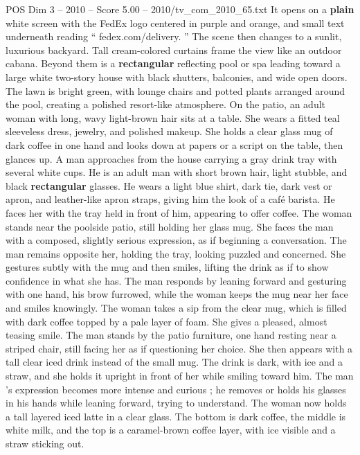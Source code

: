 \begin{textsample}{POS Dim 3 – 2010 – Score 5.00 – 2010/tv\_com\_2010\_65.txt}  \label{ex:f3_pos_083}
It opens on a \textbf{plain} white screen with the FedEx logo centered in purple and orange, and small text underneath reading “ fedex.com/delivery. ” The scene then changes to a sunlit, luxurious backyard.
Tall cream-colored curtains frame the view like an outdoor cabana.
Beyond them is a \textbf{rectangular} reflecting pool or spa leading toward a large white two-story house with black shutters, balconies, and wide open doors.
The lawn is bright green, with lounge chairs and potted plants arranged around the pool, creating a polished resort-like atmosphere.
On the patio, an adult woman with long, wavy light-brown hair sits at a table.
She wears a fitted teal sleeveless dress, jewelry, and polished makeup.
She holds a clear glass mug of dark coffee in one hand and looks down at papers or a script on the table, then glances up.
A man approaches from the house carrying a gray drink tray with several white cups.
He is an adult man with short brown hair, light stubble, and black \textbf{rectangular} glasses.
He wears a light blue shirt, dark tie, dark vest or apron, and leather-like apron straps, giving him the look of a café barista.
He faces her with the tray held in front of him, appearing to offer coffee.
The woman stands near the poolside patio, still holding her glass mug.
She faces the man with a composed, slightly serious expression, as if beginning a conversation.
The man remains opposite her, holding the tray, looking puzzled and concerned.
She gestures subtly with the mug and then smiles, lifting the drink as if to show confidence in what she has.
The man responds by leaning forward and gesturing with one hand, his brow furrowed, while the woman keeps the mug near her face and smiles knowingly.
The woman takes a sip from the clear mug, which is filled with dark coffee topped by a pale layer of foam.
She gives a pleased, almost teasing smile.
The man stands by the patio furniture, one hand resting near a striped chair, still facing her as if questioning her choice.
She then appears with a tall clear iced drink instead of the small mug.
The drink is dark, with ice and a straw, and she holds it upright in front of her while smiling toward him.
The man ’s expression becomes more intense and curious ; he removes or holds his glasses in his hands while leaning forward, trying to understand.
The woman now holds a tall layered iced latte in a clear glass.
The bottom is dark coffee, the middle is white milk, and the top is a caramel-brown coffee layer, with ice visible and a straw sticking out.

\end{textsample}
